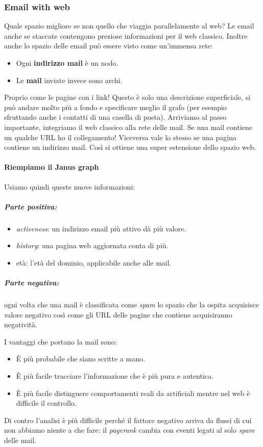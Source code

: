 				\subsubsection{Email with web}
					Quale spazio migliore se non quello che viaggia parallelamente al web? Le email anche se staccate contengono preziose informazioni per il web classico. Inoltre anche lo spazio delle email può essere visto come un'immensa rete:
					\begin{itemize}
						\item Ogni \textbf{indirizzo mail} è un nodo.
						\item Le \textbf{mail} inviate invece sono archi.
					\end{itemize}
					Proprio come le pagine con i link! Questo è solo una descrizione superficiale, si può andare molto più a fondo e specificare meglio il grafo (per esempio sfruttando anche i contatti di una casella di posta).
					Arriviamo al passo importante, integriamo il web classico alla rete delle mail. Se una mail contiene un qualche URL ho il collegamento! Viceversa vale lo stesso se una pagina contiene un indirizzo mail. Così si ottiene una super estensione dello spazio web.
					
					
				\paragraph{Riempiamo il Janus graph}
				Usiamo quindi queste nuove informazioni:
						\subparagraph{Parte positiva:}
							\begin{itemize}
								\item \emph{activeness}: un indirizzo email più attivo dà più valore.
								\item \emph{history}: una pagina web aggiornata conta di più.
								\item età: l'età del dominio, applicabile anche alle mail.
							\end{itemize}
						\subparagraph{Parte negativa:} ogni volta che una mail è classificata come \emph{spam} lo spazio che la ospita acquisisce valore negativo così come gli URL delle pagine che contiene acquisiranno negatività.
					
					I vantaggi che portano la mail sono:
					\begin{itemize}
						\item È più probabile che siano scritte a mano.
						\item È più facile tracciare l'informazione che è più pura e autentica.
						\item È più facile distinguere comportamenti reali da artificiali mentre nel web è difficile il controllo.
					\end{itemize}
					Di contro l'analisi è più difficile perché il fattore negativo arriva da flussi di cui non abbiamo niente a che fare: il \emph{pagerank} cambia con eventi legati al solo \emph{spam} delle mail.
					
